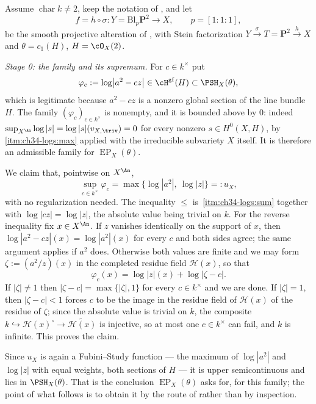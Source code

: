 \begin{example}
\label{ex:ch42-endtoend}
Assume $\operatorname{char}k\ne2$, keep the notation of
, and let
\[
 f=h\circ\sigma:Y=\mathrm{Bl}_p\mathbf P^2\longrightarrow X,
 \qquad p=[1:1:1],
\]
be the smooth projective alteration of , with Stein
factorization $Y\xrightarrow{\sigma}T=\mathbf P^2\xrightarrow{h}X$ and
$\theta=c_1(H)$, $H=\cO_X(2)$.

\emph{Stage 0: the family and its supremum.}
For $c\in k^\times$ put
\[
 \varphi_c:=\log\bigl|a^2-cz\bigr|\in\cH^{\mathrm{gf}}(H)\subset
 \PSH_X(\theta),
\]
which is legitimate because $a^2-cz$ is a nonzero global section of the
line bundle $H$.  The family $(\varphi_c)_{c\in k^\times}$ is nonempty,
and it is bounded above by $0$: indeed
$\sup_{X^{\An}}\log|s|=\log|s|(v_{X,\triv})=0$ for every nonzero
$s\in H^0(X,H)$, by
\,\cref{itm:ch34-logs:max} applied with the
irreducible subvariety $X$ itself.  It is therefore an admissible family
for $\operatorname{EP}_X(\theta)$.

We claim that, pointwise on $X^{\An}$,
\[
 \sup_{c\in k^\times}\varphi_c
 =\max\bigl\{\log|a^2|,\ \log|z|\bigr\}=:u_X ,
\]
with no regularization needed.  The inequality $\le$ is
\,\cref{itm:ch34-logs:sum} together with
$\log|cz|=\log|z|$, the absolute value being trivial on $k$.  For the
reverse inequality fix $x\in X^{\An}$.  If $z$ vanishes identically on
the support of $x$, then $\log|a^2-cz|(x)=\log|a^2|(x)$ for every $c$
and both sides agree; the same argument applies if $a^2$ does.  Otherwise
both values are finite and we may form
$\zeta:=(a^2/z)(x)$ in the completed residue field $\mathcal H(x)$, so
that
\[
 \varphi_c(x)=\log|z|(x)+\log|\zeta-c| .
\]
If $|\zeta|\ne1$ then $|\zeta-c|=\max\{|\zeta|,1\}$ for every
$c\in k^\times$ and we are done.  If $|\zeta|=1$, then
$|\zeta-c|<1$ forces $c$ to be the image in the residue field of
$\mathcal H(x)$ of the residue of $\zeta$; since the absolute value is
trivial on $k$, the composite $k\hookrightarrow\mathcal H(x)^{\circ}\to
\widetilde{\mathcal H(x)}$ is injective, so at most one $c\in k^\times$
can fail, and $k$ is infinite.  This proves the claim.

Since $u_X$ is again a Fubini--Study function --- the maximum of
$\log|a^2|$ and $\log|z|$ with equal weights, both sections of $H$ ---
it is upper semicontinuous and lies in $\PSH_X(\theta)$.  That is the
conclusion $\operatorname{EP}_X(\theta)$ asks for, for this family; the
point of what follows is to obtain it by the route of
 rather than by inspection.


\end{example}
